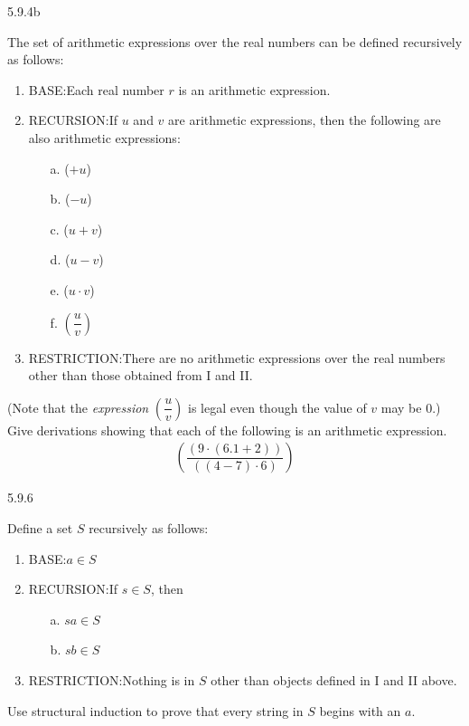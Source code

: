 \documentclass[11pt]{article}
\begin{document}
\begin{question}
    {5.9.4b}
    {
        The set of arithmetic expressions over the real numbers can be defined recursively as follows:
        \vspace{-\baselineskip}
        \begin{enumerate}[label=\Roman*.]
            \item BASE:\@ Each real number $r$ is an arithmetic expression.
            \item RECURSION:\@ If $u$ and $v$ are arithmetic expressions, then the following are also arithmetic expressions:
                \begin{enumerate}
                    \item[a.] ($+u$)
                    \item[b.] ($-u$)
                    \item[c.] ($u + v$)
                    \item[d.] ($u - v$)
                    \item[e.] ($u \cdot v$)
                    \item[f.] $\left(\dfrac{u}{v} \right)$
                \end{enumerate}
            \item RESTRICTION:\@ There are no arithmetic expressions over the real numbers other than those obtained from I and II.\@
        \end{enumerate}
        \vspace{-\baselineskip}
        (Note that the \textit{expression} $\left(\dfrac{u}{v} \right)$ is legal even though the value of $v$ may be $0$.) Give derivations showing that each of the following is an arithmetic expression.
        \begin{align*}
            \left(\dfrac{(9 \cdot (6.1 + 2))}{((4-7) \cdot 6)} \right)
        \end{align*}
    }
\end{question}

\begin{question}
    {5.9.6}
    {
        Define a set $S$ recursively as follows:
        \vspace{-\baselineskip}
        \begin{enumerate}[label=\Roman*.]
            \item BASE:\@ $a \in S$
            \item RECURSION:\@ If $s \in S$, then
                \begin{enumerate}
                    \item[a.] $sa \in S$
                    \item[b.] $sb \in S$
                \end{enumerate}
            \item RESTRICTION:\@ Nothing is in $S$ other than objects defined in I and II above.
        \end{enumerate}
        \vspace{-\baselineskip}
        Use structural induction to prove that every string in $S$ begins with an $a$.
    }
\end{question}
\end{document}
